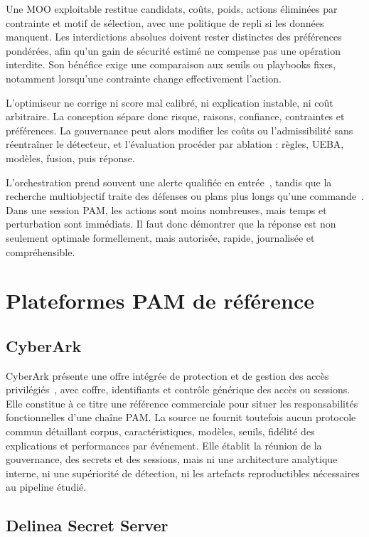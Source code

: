 \documentclass[11pt,a4paper,oneside]{report}
\theoremstyle{definition}
\theoremstyle{plain}
\begin{document}
Une MOO exploitable restitue candidats, coûts, poids, actions éliminées par contrainte et motif de sélection, avec une politique de repli si les données manquent. Les interdictions absolues doivent rester distinctes des préférences pondérées, afin qu'un gain de sécurité estimé ne compense pas une opération interdite. Son bénéfice exige une comparaison aux seuils ou playbooks fixes, notamment lorsqu'une contrainte change effectivement l'action.

L'optimiseur ne corrige ni score mal calibré, ni explication instable, ni coût arbitraire. La conception sépare donc risque, raisons, confiance, contraintes et préférences. La gouvernance peut alors modifier les coûts ou l'admissibilité sans réentraîner le détecteur, et l'évaluation procéder par ablation : règles, UEBA, modèles, fusion, puis réponse.

L'orchestration prend souvent une alerte qualifiée en entrée~\cite{ref15,ref41}, tandis que la recherche multiobjectif traite des défenses ou plans plus longs qu'une commande~\cite{ref33,ref38}. Dans une session PAM, les actions sont moins nombreuses, mais temps et perturbation sont immédiats. Il faut donc démontrer que la réponse est non seulement optimale formellement, mais autorisée, rapide, journalisée et compréhensible.

\section{Plateformes PAM de référence}
\label{sec:domain-products}

\subsection{CyberArk}

CyberArk présente une offre intégrée de protection et de gestion des accès privilégiés~\cite{ref16}, avec coffre, identifiants et contrôle générique des accès ou sessions. Elle constitue à ce titre une référence commerciale pour situer les responsabilités fonctionnelles d'une chaîne PAM. La source ne fournit toutefois aucun protocole commun détaillant corpus, caractéristiques, modèles, seuils, fidélité des explications et performances par événement. Elle établit la réunion de la gouvernance, des secrets et des sessions, mais ni une architecture analytique interne, ni une supériorité de détection, ni les artefacts reproductibles nécessaires au pipeline étudié.

\subsection{Delinea Secret Server}
\end{document}
